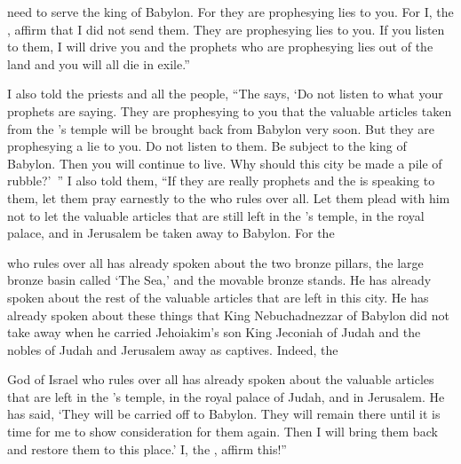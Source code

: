 {need to serve
the king
of Babylon.
For
they
are prophesying
lies to you.
For
I, the
{}, affirm
that I did not
send
them. They
are prophesying
lies
to you. If you listen to them, I will drive
you and the prophets
who are prophesying
lies out of the land and you
will all die in exile.”
\par }{\PP {}I also told
the priests
and all
the people,
“The
{}
says,
‘Do not
listen
to
what
your prophets
are saying.
They are prophesying
to you that the valuable
articles
taken from the
{}’s
temple
will be brought back
from Babylon
very
soon.
But
they
are prophesying
a lie to you.
Do not
listen
to them.
Be subject
to the king
of Babylon.
Then you will continue to live.
Why
should this
city
be made a pile of rubble?’ ”
I also told them, “If
they
are really prophets
and the
{}
is
speaking
to them, let
them pray earnestly
to the
{}
who rules over all.
Let them plead with him not
to let the valuable articles
that are still left
in the
{}’s
temple,
in the royal
palace,
and in Jerusalem
be taken away to Babylon.
For
the

{}
who rules over all
has already spoken about the two bronze pillars,
the large bronze basin called ‘The Sea,’
and the movable
bronze stands.
He has already spoken about the rest
of the valuable articles
that are left
in this
city.
He has already spoken about these things that King
Nebuchadnezzar
of Babylon
did not
take away
when he carried
Jehoiakim’s
son
King
Jeconiah
of Judah
and the nobles
of Judah
and Jerusalem away as captives.
Indeed,
the

{}
God
of Israel
who rules over all
has already spoken about the valuable articles
that are left
in the
{}’s
temple,
in the royal
palace
of Judah,
and in Jerusalem.
He has said, ‘They will be
carried off
to Babylon.
They will remain there
until
it is time
for me to show consideration
for them again. Then I will bring
them back and restore
them to
this
place.’
I, the
{}, affirm this!”

\par }
